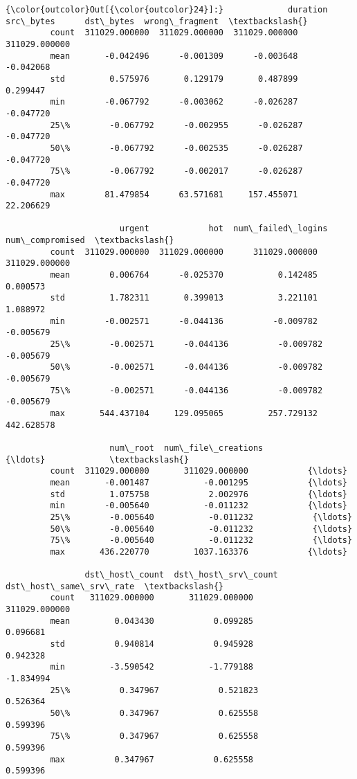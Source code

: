 \documentclass[11pt]{article}
\begin{document}
\begin{Verbatim}[commandchars=\\\{\}]
{\color{outcolor}Out[{\color{outcolor}24}]:}             duration      src\_bytes      dst\_bytes  wrong\_fragment  \textbackslash{}
         count  311029.000000  311029.000000  311029.000000   311029.000000   
         mean       -0.042496      -0.001309      -0.003648       -0.042068   
         std         0.575976       0.129179       0.487899        0.299447   
         min        -0.067792      -0.003062      -0.026287       -0.047720   
         25\%        -0.067792      -0.002955      -0.026287       -0.047720   
         50\%        -0.067792      -0.002535      -0.026287       -0.047720   
         75\%        -0.067792      -0.002017      -0.026287       -0.047720   
         max        81.479854      63.571681     157.455071       22.206629   
         
                       urgent            hot  num\_failed\_logins  num\_compromised  \textbackslash{}
         count  311029.000000  311029.000000      311029.000000    311029.000000   
         mean        0.006764      -0.025370           0.142485         0.000573   
         std         1.782311       0.399013           3.221101         1.088972   
         min        -0.002571      -0.044136          -0.009782        -0.005679   
         25\%        -0.002571      -0.044136          -0.009782        -0.005679   
         50\%        -0.002571      -0.044136          -0.009782        -0.005679   
         75\%        -0.002571      -0.044136          -0.009782        -0.005679   
         max       544.437104     129.095065         257.729132       442.628578   
         
                     num\_root  num\_file\_creations            {\ldots}             \textbackslash{}
         count  311029.000000       311029.000000            {\ldots}              
         mean       -0.001487           -0.001295            {\ldots}              
         std         1.075758            2.002976            {\ldots}              
         min        -0.005640           -0.011232            {\ldots}              
         25\%        -0.005640           -0.011232            {\ldots}              
         50\%        -0.005640           -0.011232            {\ldots}              
         75\%        -0.005640           -0.011232            {\ldots}              
         max       436.220770         1037.163376            {\ldots}              
         
                dst\_host\_count  dst\_host\_srv\_count  dst\_host\_same\_srv\_rate  \textbackslash{}
         count   311029.000000       311029.000000           311029.000000   
         mean         0.043430            0.099285                0.096681   
         std          0.940814            0.945928                0.942328   
         min         -3.590542           -1.779188               -1.834994   
         25\%          0.347967            0.521823                0.526364   
         50\%          0.347967            0.625558                0.599396   
         75\%          0.347967            0.625558                0.599396   
         max          0.347967            0.625558                0.599396   
         

\end{Verbatim}
\end{document}
